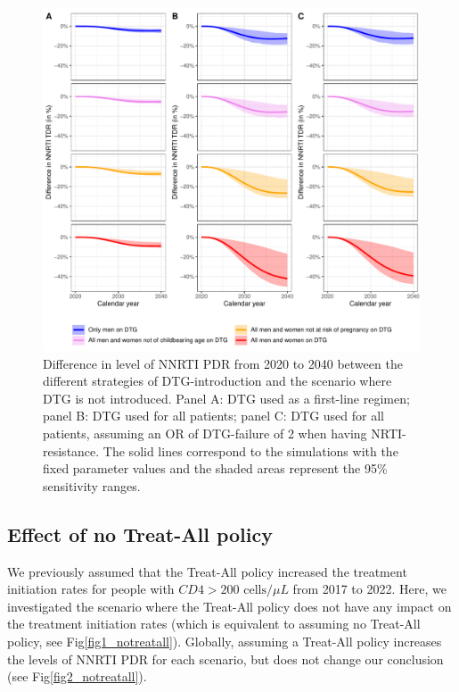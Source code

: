 \documentclass{article}
\begin{document}
\begin{figure}[h!]
\centering
   \includegraphics[width=16cm]{../figures/sens_diff_uncertainty.pdf}
   \caption{Difference in level of NNRTI PDR from 2020 to 2040 between the different strategies of DTG-introduction and the scenario where DTG is not introduced. Panel A: DTG used as a first-line regimen; panel B: DTG used for all patients; panel C: DTG used for all patients, assuming an OR of DTG-failure of 2 when having NRTI-resistance. The solid lines correspond to the simulations with the fixed parameter values and the shaded areas represent the 95\% sensitivity ranges.}\label{fig:diff_sensitivity_range}
\end{figure}

\subsection{Effect of no Treat-All policy}
We previously assumed that the Treat-All policy increased the treatment initiation rates for people with $CD4>200\text{ cells}/\mu L$ from 2017 to 2022. Here, we investigated the scenario where the Treat-All policy does not have any impact on the treatment initiation rates (which is equivalent to assuming no Treat-All policy, see Fig\ref{fig1_notreatall}). Globally, assuming a Treat-All policy increases the levels of NNRTI PDR for each scenario, but does not change our conclusion (see Fig\ref{fig2_notreatall}).
\end{document}
